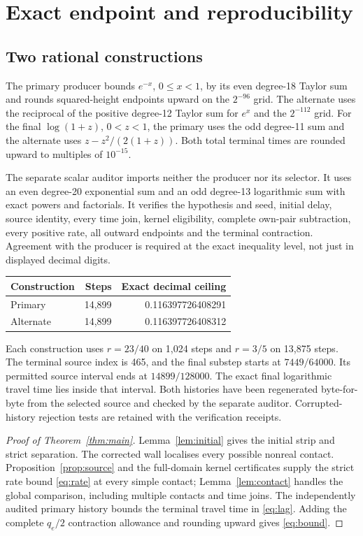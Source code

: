 \documentclass[11pt,a4paper]{article}
\theoremstyle{definition}\newtheorem{definition}[theorem]{Definition}
\theoremstyle{remark}\newtheorem{remark}[theorem]{Remark}
\begin{document}
\section{Exact endpoint and reproducibility}\label{sec:replay}
\subsection{Two rational constructions}
The primary producer bounds $e^{-x}$, $0\le x<1$, by its even degree-18
Taylor sum and rounds squared-height endpoints upward on the $2^{-96}$
grid. The alternate uses the reciprocal of the positive degree-12 Taylor
sum for $e^x$ and the $2^{-112}$ grid. For the final $\log(1+z)$,
$0<z<1$, the primary uses the odd degree-11 sum and the alternate uses
$z-z^2/(2(1+z))$. Both total terminal times are rounded upward to
multiples of $10^{-15}$.

The separate scalar auditor imports neither the producer nor its
selector. It uses an even degree-20 exponential sum and an odd degree-13
logarithmic sum with exact powers and factorials. It verifies the
hypothesis and seed, initial delay, source identity, every time join,
kernel eligibility, complete own-pair subtraction, every positive rate,
all outward endpoints and the terminal contraction. Agreement with the
producer is required at the exact inequality level, not just in displayed
decimal digits.

\begin{center}\small
\begin{tabular}{@{}lrr@{}}\toprule
Construction & Steps & Exact decimal ceiling\\\midrule
Primary & 14,899 & 0.116397726408291\\
Alternate & 14,899 & 0.116397726408312\\\bottomrule
\end{tabular}
\end{center}
Each construction uses $r=23/40$ on 1,024 steps and $r=3/5$ on 13,875
steps. The terminal source index is 465, and the final substep starts at
$7449/64000$. Its permitted source interval ends at $14899/128000$.
The exact final logarithmic travel time lies inside that interval.
Both histories have been regenerated byte-for-byte from the selected
source and checked by the separate auditor. Corrupted-history rejection
tests are retained with the verification receipts.

\begin{proof}[Proof of Theorem~\ref{thm:main}]
Lemma~\ref{lem:initial} gives the initial strip and strict separation.
The corrected wall localises every possible nonreal contact.
Proposition~\ref{prop:source} and the full-domain kernel certificates
supply the strict rate bound \eqref{eq:rate} at every simple contact;
Lemma~\ref{lem:contact} handles the global comparison, including multiple
contacts and time joins. The independently audited primary history
bounds the terminal travel time in \eqref{eq:lag}. Adding the complete
$q_e/2$ contraction allowance and rounding upward gives
\eqref{eq:bound}.
\end{proof}
\end{document}
